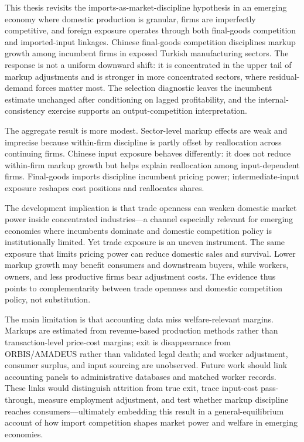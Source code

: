 \documentclass[12pt]{article}
\newif\iffastcompile
\newcommand{\printbibliography}{}
\begin{document}
This thesis revisits the imports-as-market-discipline hypothesis in an emerging economy where domestic production is granular, firms are imperfectly competitive, and foreign exposure operates through both final-goods competition and imported-input linkages. Chinese final-goods competition disciplines markup growth among incumbent firms in exposed Turkish manufacturing sectors. The response is not a uniform downward shift: it is concentrated in the upper tail of markup adjustments and is stronger in more concentrated sectors, where residual-demand forces matter most. The selection diagnostic leaves the incumbent estimate unchanged after conditioning on lagged profitability, and the internal-consistency exercise supports an output-competition interpretation.

The aggregate result is more modest. Sector-level markup effects are weak and imprecise because within-firm discipline is partly offset by reallocation across continuing firms. Chinese input exposure behaves differently: it does not reduce within-firm markup growth but helps explain reallocation among input-dependent firms. Final-goods imports discipline incumbent pricing power; intermediate-input exposure reshapes cost positions and reallocates shares.

The development implication is that trade openness can weaken domestic market power inside concentrated industries—a channel especially relevant for emerging economies where incumbents dominate and domestic competition policy is institutionally limited. Yet trade exposure is an uneven instrument. The same exposure that limits pricing power can reduce domestic sales and survival. Lower markup growth may benefit consumers and downstream buyers, while workers, owners, and less productive firms bear adjustment costs. The evidence thus points to complementarity between trade openness and domestic competition policy, not substitution.

The main limitation is that accounting data miss welfare-relevant margins. Markups are estimated from revenue-based production methods rather than transaction-level price-cost margins; exit is disappearance from ORBIS/AMADEUS rather than validated legal death; and worker adjustment, consumer surplus, and input sourcing are unobserved. Future work should link accounting panels to administrative databases and matched worker records. These links would distinguish attrition from true exit, trace input-cost pass-through, measure employment adjustment, and test whether markup discipline reaches consumers—ultimately embedding this result in a general-equilibrium account of how import competition shapes market power and welfare in emerging economies.

\pagebreak

\printbibliography

\iffastcompile
\end{document}
